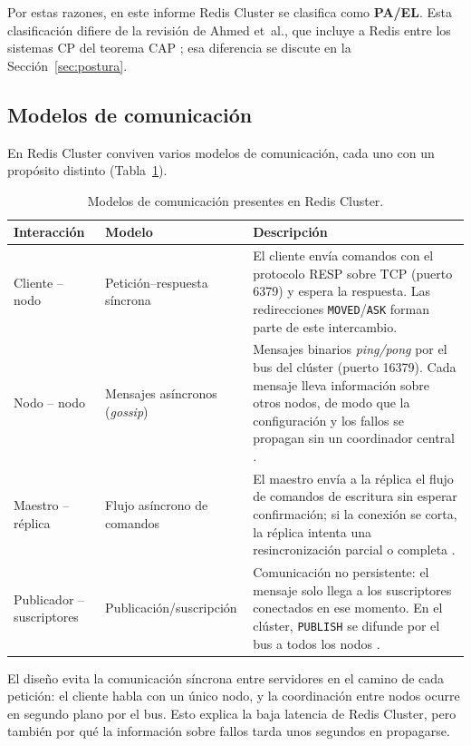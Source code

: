 \documentclass[11pt,a4paper]{article}
\begin{document}
Por estas razones, en este informe Redis Cluster se clasifica como
\textbf{PA/EL}. Esta clasificación difiere de la revisión de Ahmed et~al.,
que incluye a Redis entre los sistemas CP del teorema CAP
\cite[p.~172]{ahmed2023consistency}; esa diferencia se discute en la
Sección~\ref{sec:postura}.

\subsection{Modelos de comunicación}

En Redis Cluster conviven varios modelos de comunicación, cada uno con un
propósito distinto (Tabla~\ref{tab:comunicacion}).

\begin{table}[H]
  \centering
  \caption{Modelos de comunicación presentes en Redis Cluster.}
  \label{tab:comunicacion}
  \small
  \begin{tabularx}{\linewidth}{l l X}
    \toprule
    \textbf{Interacción} & \textbf{Modelo} & \textbf{Descripción} \\
    \midrule
    Cliente -- nodo & Petición--respuesta síncrona &
      El cliente envía comandos con el protocolo RESP sobre TCP (puerto 6379)
      y espera la respuesta. Las redirecciones \texttt{MOVED}/\texttt{ASK}
      forman parte de este intercambio. \\
    Nodo -- nodo & Mensajes asíncronos (\emph{gossip}) &
      Mensajes binarios \emph{ping/pong} por el bus del clúster (puerto
      16379). Cada mensaje lleva información sobre otros nodos, de modo que
      la configuración y los fallos se propagan sin un coordinador central
      \cite{redis2026clusterspec}. \\
    Maestro -- réplica & Flujo asíncrono de comandos &
      El maestro envía a la réplica el flujo de comandos de escritura sin
      esperar confirmación; si la conexión se corta, la réplica intenta una
      resincronización parcial o completa \cite{redis2026replication}. \\
    Publicador -- suscriptores & Publicación/suscripción &
      Comunicación no persistente: el mensaje solo llega a los suscriptores
      conectados en ese momento. En el clúster, \texttt{PUBLISH} se difunde
      por el bus a todos los nodos \cite{redis2026clusterspec}. \\
    \bottomrule
  \end{tabularx}
\end{table}

El diseño evita la comunicación síncrona entre servidores en el camino de
cada petición: el cliente habla con un único nodo, y la coordinación entre
nodos ocurre en segundo plano por el bus. Esto explica la baja latencia de
Redis Cluster, pero también por qué la información sobre fallos tarda unos
segundos en propagarse.
\end{document}
